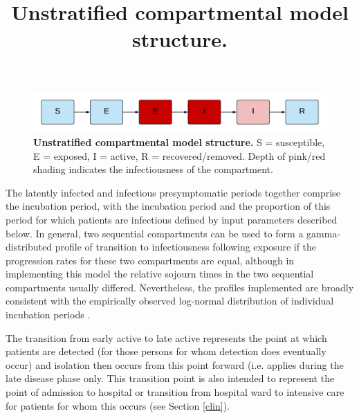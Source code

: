 \begin{figure}[ht]
    \includegraphics[width=\textwidth]{../covid_19/covid_19_seeiir.pdf}
	\title{Unstratified compartmental model structure.}    
    \caption{\textbf{Unstratified compartmental model structure.} S = susceptible, E = exposed, I = active, R = recovered/removed. Depth of pink/red shading indicates the infectiousness of the compartment.}
    \label{fig:seeiir}
\end{figure}

The latently infected and infectious presymptomatic periods together comprise the incubation period, with the incubation period and the proportion of this period for which patients are infectious defined by input parameters described below. In general, two sequential compartments can be used to form a gamma-distributed profile of transition to infectiousness following exposure if the progression rates for these two compartments are equal, although in implementing this model the relative sojourn times in the two sequential compartments usually differed. Nevertheless, the profiles implemented are broadly consistent with the empirically observed log-normal distribution of individual incubation periods \cite{RN13}.

The transition from early active to late active represents the point at which patients are detected (for those persons for whom detection does eventually occur) and isolation then occurs from this point forward (i.e. applies during the late disease phase only. This transition point is also intended to represent the point of admission to hospital or transition from hospital ward to intensive care for patients for whom this occurs (see Section \ref{clin}).
